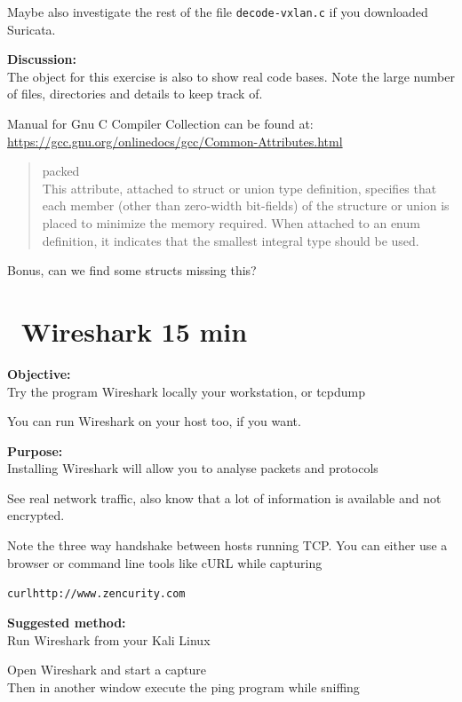 \documentclass[a4paper,11pt,notitlepage]{report}
\begin{document}
Maybe also investigate the rest of the file \verb+decode-vxlan.c+ if you downloaded Suricata.

{\bf Discussion:}\\
The object for this exercise is also to show real code bases. Note the large number of files, directories and details to keep track of.

Manual for Gnu C Compiler Collection can be found at:\\
\url{https://gcc.gnu.org/onlinedocs/gcc/Common-Attributes.html}


\begin{quote}
packed\\
This attribute, attached to struct or union type definition, specifies that each member (other than zero-width bit-fields) of the structure or union is placed to minimize the memory required. When attached to an enum definition, it indicates that the smallest integral type should be used.
\end{quote}

Bonus, can we find some structs missing this?



\chapter{\faInfoCircle\ Wireshark 15 min}
\label{ex:wireshark-install}



{\bf Objective:}\\
Try the program Wireshark locally your workstation, or tcpdump

You can run Wireshark on your host too, if you want.

{\bf Purpose:}\\
Installing Wireshark will allow you to analyse packets and protocols

See real network traffic, also know that a lot of information is available and not encrypted.

Note the three way handshake between hosts running TCP. You can either use a browser or command line tools like cURL while capturing

\begin{alltt}
curl http://www.zencurity.com
\end{alltt}


{\bf Suggested method:}\\
Run Wireshark from your Kali Linux

Open Wireshark and start a capture\\
Then in another window execute the ping program while sniffing
\end{document}
